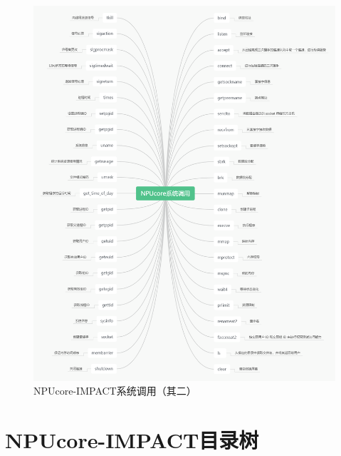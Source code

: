 \begin{figure}[htp]
    \centering
    \includegraphics[width=1\linewidth]{figs/01-03-NPUcore系统调用2.png}
    \caption{NPUcore-IMPACT系统调用（其二）}
    \label{fig:syscall2}
\end{figure}

\section{NPUcore-IMPACT目录树}

